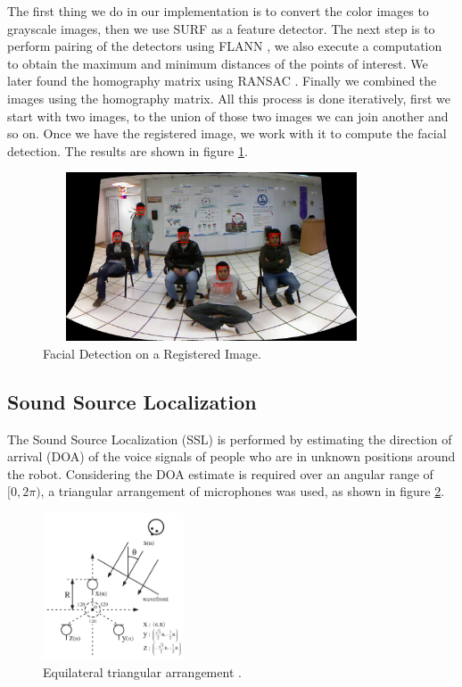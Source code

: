 \documentclass{llncs}
\begin{document}
The first thing we do in our implementation is to convert the color images to grayscale images, then we use SURF \cite{surf} as a feature detector. The next step is to perform pairing of the detectors using FLANN \cite{flann}, we also execute a computation to obtain the maximum and minimum distances of the points of interest. We later found the homography matrix using RANSAC \cite{ransac}. Finally we combined the images using the homography matrix. All this process is done iteratively, first we start with two images, to the union of those two images we can join another and so on. Once we have the registered image, we work with it to compute the facial detection. The results are shown in figure \ref{pano_image}.
\begin{figure}[h]
	\centering
	\includegraphics[angle=0, height=5cm, width=10cm]{Figures/sceneComplete_pano.png}
	\caption{Facial Detection on a Registered Image.}
	\label{pano_image}
\end{figure}
 


\subsection{Sound Source Localization}\label{subsec:SoundSource}
The Sound Source Localization (SSL) is performed by estimating the direction of arrival (DOA) of the voice signals of people who are in unknown positions around the robot. Considering the DOA estimate is required over an angular range of $[0,2\pi)$, a triangular arrangement of microphones was used, as shown in figure \ref{F_array}.

\begin{figure}[h]
	\centering
	\includegraphics[width=0.37\textwidth]{Figures/array.png}
	\caption{Equilateral triangular arrangement \cite{hioka2003}.}
	\label{F_array}
\end{figure}
\end{document}
